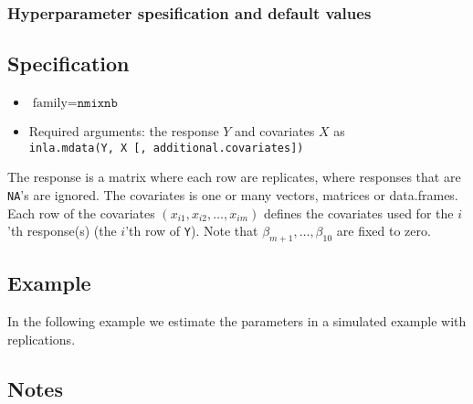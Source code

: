 \documentclass[a4paper,11pt]{article}
\def\mmax{10}
\begin{document}
\subsubsection*{Hyperparameter spesification and default values}


\subsection*{Specification}

\begin{itemize}
\item $\text{family}=\texttt{nmixnb}$
\item Required arguments: the response $Y$ and covariates $X$ as\\
    \verb|inla.mdata(Y, X [, additional.covariates])|
\end{itemize}
The response is a matrix where each row are replicates, where
responses that are \texttt{NA}'s are ignored. The covariates is one or
many vectors, matrices or data.frames. Each row of the covariates
$(x_{i1}, x_{i2}, \ldots, x_{im})$ defines the covariates used for the
$i$'th response(s) (the $i$'th row of \texttt{Y}). Note that
$\beta_{m+1}, \ldots, \beta_{\mmax}$ are fixed to zero.


\subsection*{Example}

In the following example we estimate the parameters in a simulated
example with replications.



\subsection*{Notes}
\end{document}

